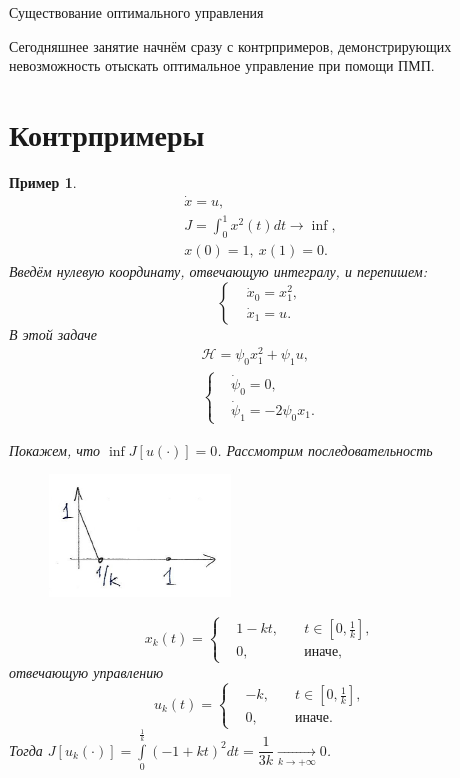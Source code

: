 \documentclass[12pt, a4paper]{article}
\theoremstyle{rusdef}
\newtheorem{example}{Пример}
\renewcommand{\H}{\mathcal{H}} %
\DeclareMathOperator*{\To}{\longrightarrow}
\begin{document}
\parbox{11.8cm}{
  \begin{center}
    {\Huge Существование оптимального управления}
  \end{center}
}

Сегодняшнее занятие начнём сразу с контрпримеров, демонстрирующих невозможность отыскать оптимальное управление при помощи ПМП.

\section{Контрпримеры}
\begin{example}
  \begin{gather*}
    \dot{x} = u, \\
    J = \int_0^1 x^2(t) dt \to \inf, \\
    x(0) = 1, \: x(1) = 0.
  \end{gather*}
  Введём нулевую координату, отвечающую интегралу, и перепишем:
  \[
    \left\{
      \begin{aligned}
        &\dot{x}_0 = x_1 ^ 2, \\
        &\dot{x}_1 = u.
      \end{aligned}
    \right.
  \]
  В этой задаче
  \begin{gather*}
    \H = \psi_0 x_1^2 + \psi_1 u, \\
    \left\{
      \begin{aligned}
        &\dot{\psi}_0 = 0, \\
        &\dot{\psi}_1 = -2 \psi_0 x_1.
      \end{aligned}
    \right.
  \end{gather*}
  
  Покажем, что $\inf J[u(\cdot)] = 0$. Рассмотрим последовательность

  \begin{figure}[ht!]
    \centering
    \includegraphics{pic1.png}
  \end{figure}

  \[
    x_k(t) =
    \left\{
      \begin{aligned}
        &1 - kt, &\quad t \in \left[0, \frac{1}{k}\right], \\
        &0, &\quad \text{иначе},
      \end{aligned}
    \right.
  \]
  отвечающую управлению
  \[
    u_k(t) =
    \left\{
      \begin{aligned}
        &-k, &\quad t \in \left[0, \frac{1}{k}\right], \\
        &0, &\quad \text{иначе}.
      \end{aligned}
    \right.
  \]
  Тогда $J[u_k(\cdot)] = \int\limits_0^{\frac{1}{k}}(-1 + kt)^2 dt = \dfrac{1}{3k} \To\limits_{k \to +\infty} 0$.


\end{example}
\end{document}
